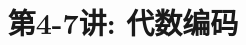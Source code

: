 \documentclass[a4paper, justified]{tufte-handout}
\title{第4-7讲: 代数编码}
\date{\zhtoday} %
\begin{document}
\maketitle
\noplagiarism %
\begin{abstract}
\end{abstract}
\beginrequired

\begin{problem}[TJ 8-6(b,d)]
\end{problem}
\end{document}
